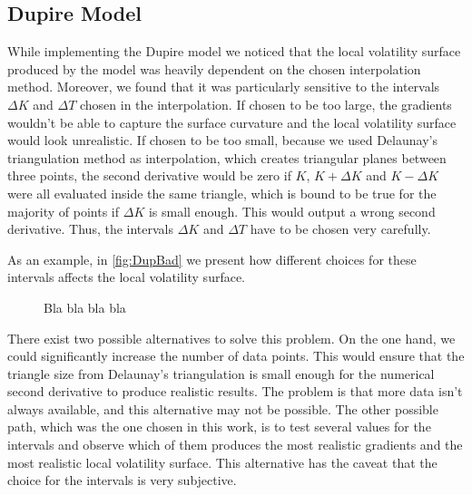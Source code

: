 \subsection{Dupire Model}
While implementing the Dupire model we noticed that the local volatility surface produced by the model was heavily dependent on the chosen interpolation method. Moreover, we found that it was particularly sensitive to the intervals $\Delta K$ and $\Delta T$ chosen in the interpolation. If chosen to be too large, the gradients wouldn't be able to capture the surface curvature and the local volatility surface would look unrealistic. If chosen to be too small, because we used Delaunay's triangulation method as interpolation, which creates triangular planes between three points, the second derivative would be zero if $K$, $K+\Delta K$ and $K-\Delta K$ were all evaluated inside the same triangle, which is bound to be true for the majority of points if $\Delta K$ is small enough. This would output a wrong second derivative.
Thus, the intervals $\Delta K$ and $\Delta T$ have to be chosen very carefully.

As an example, in \autoref{fig:DupBad} we present how different choices for these intervals affects the local volatility surface.

\begin{figure}[H]
  \begin{subfigmatrix}{2}
  \end{subfigmatrix}
    \caption[Bla bla bla bla]{Bla bla bla bla}\label{fig:DupBad}
\end{figure} 

There exist two possible alternatives to solve this problem.
On the one hand, we could significantly increase the number of data points. This would ensure that the triangle size from Delaunay's triangulation is small enough for the numerical second derivative to produce realistic results. The problem is that more data isn't always available, and this alternative may not be possible.
The other possible path, which was the one chosen in this work, is to test several values for the intervals and observe which of them produces the most realistic gradients and the most realistic local volatility surface. This alternative has the caveat that the choice for the intervals is very subjective.

